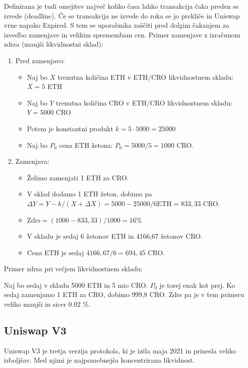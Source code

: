 \documentclass[a4paper,12pt]{article}%
\begin{document}
Definirana je tudi omejitev največ koliko časa lahko transakcija čaka preden se izvede (deadline). Če se transakcija ne izvede do roka se jo prekliče in Uniswap vrne napako Expired. S tem se uporabnika zaščiti pred dolgim čakanjem za izvedbo zamenjave in velikim spremembam cen.
\newline
Primer zamenjave z izračunom zdrsa (manjši likvidnostni sklad):
\begin{enumerate}
    \item Pred zamenjavo:
    \begin{itemize}
        \item Naj bo $X$ trenutna količina ETH v ETH/CRO likvidnostnem skladu: $X = 5$ ETH
        \item Naj bo $Y$ trenutna količina CRO v ETH/CRO likvidnostnem skladu: $Y = 5000$ CRO 
        \item Potem je konstantni produkt $k = 5 \cdot 5000 = 25000$
        \item Naj bo $P_0$ cena ETH žetona: $P_0 = 5000/5 = 1000$ CRO. 
    \end{itemize}
    \item Zamenjava: 
    \begin{itemize}
        \item Želimo zamenjati 1 ETH za CRO.
        \item V sklad dodamo 1 ETH žeton, dobimo pa $\Delta Y = Y - k/(X+\Delta X) = 5000 - 25000/{6 \text{ETH}} = 833,33$ CRO.
        \item $\text{Zdrs} = (1000 - 833,33)/1000 =  16 \%  $
        \item V skladu je sedaj 6 žetonov ETH in 4166,67 žetonov CRO.
        \item Cena ETH je sedaj $4166,67/6 = 694,45$ CRO.
    \end{itemize}
\end{enumerate}

Primer zdrsa pri večjem likvidnostnem skladu:

Naj bo sedaj v skladu 5000 ETH in 5 mio CRO. $P_0$ je torej enak kot prej. Ko sedaj zamenjamo 1 ETH za CRO, dobimo 999,8 CRO. Zdrs pa je v tem primeru veliko manjši in sicer 0.02 \%. 


\subsection{Uniswap V3}

Uniswap V3 je tretja verzija protokola, ki je izšla maja 2021 in prinesla veliko izboljšav. Med njimi je najpomebnejša koncentrirana likvidnost. 
\end{document}
